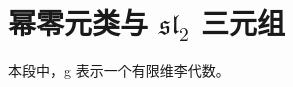 \section{\texorpdfstring{幂零元类与 \(\mathfrak{sl}_2\) 三元组}{\textbackslash mathfrak\{sl\}\_2 三元组}}

本段中，g 表示一个有限维李代数。

